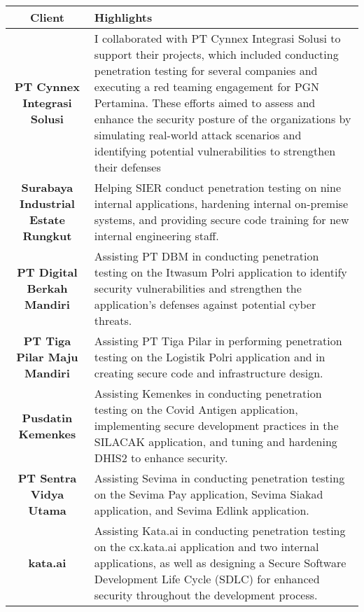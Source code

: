 \documentclass[10pt, letterpaper]{article}
\begin{document}
	\begin{table}[ht]
		\centering
		\begin{tabular}{|c|p{11cm}|}
			\hline
			\textbf{Client} & \textbf{Highlights} \\ \hline
			\textbf{PT Cynnex Integrasi Solusi} & 
			I collaborated with PT Cynnex Integrasi Solusi to support their projects, which included conducting penetration testing for several companies and executing a red teaming engagement for PGN Pertamina. These efforts aimed to assess and enhance the security posture of the organizations by simulating real-world attack scenarios and identifying potential vulnerabilities to strengthen their defenses \\ \hline
			
			\textbf{Surabaya Industrial Estate Rungkut} & 
			Helping SIER conduct penetration testing on nine internal applications, hardening internal on-premise systems, and providing secure code training for new internal engineering staff. \\ \hline
			
			\textbf{PT Digital Berkah Mandiri} & 
			Assisting PT DBM in conducting penetration testing on the Itwasum Polri application to identify security vulnerabilities and strengthen the application's defenses against potential cyber threats. \\ \hline
			
			\textbf{PT Tiga Pilar Maju Mandiri} & 
			Assisting PT Tiga Pilar in performing penetration testing on the Logistik Polri application and in creating secure code and infrastructure design. \\ \hline
			
			\textbf{Pusdatin Kemenkes} & 
			Assisting Kemenkes in conducting penetration testing on the Covid Antigen application, implementing secure development practices in the SILACAK application, and tuning and hardening DHIS2 to enhance security. \\ \hline
			
			\textbf{PT Sentra Vidya Utama} & 
			Assisting Sevima in conducting penetration testing on the Sevima Pay application, Sevima Siakad application, and Sevima Edlink application. \\ \hline
			
			\textbf{kata.ai} & 
			Assisting Kata.ai in conducting penetration testing on the cx.kata.ai application and two internal applications, as well as designing a Secure Software Development Life Cycle (SDLC) for enhanced security throughout the development process. \\ \hline
			

\end{tabular}
\end{table}
\end{document}
